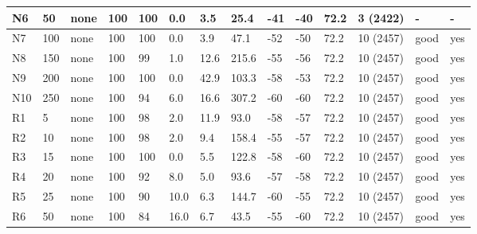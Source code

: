 \begin{center}
\begin{longtable}{|l|l|l|l|l|l|l|l|l|l|l|l|l|l|}
\hline
N6 & 50 & none & 100 & 100 & 0.0 & 3.5 & 25.4 & -41 & -40 & 72.2 & 3 (2422) & - & - \\
\hline
N7 & 100 & none & 100 & 100 & 0.0 & 3.9 & 47.1 & -52 & -50 & 72.2 & 10 (2457) & good & yes \\
\hline
N8 & 150 & none & 100 & 99 & 1.0 & 12.6 & 215.6 & -55 & -56 & 72.2 & 10 (2457) & good & yes \\
\hline
N9 & 200 & none & 100 & 100 & 0.0 & 42.9 & 103.3 & -58 & -53 & 72.2 & 10 (2457) & good & yes \\
\hline
N10 & 250 & none & 100 & 94 & 6.0 & 16.6 & 307.2 & -60 & -60 & 72.2 & 10 (2457) & good & yes \\
\hline
R1 & 5 & none & 100 & 98 & 2.0 & 11.9 & 93.0 & -58 & -57 & 72.2 & 10 (2457) & good & yes \\
\hline
R2 & 10 & none & 100 & 98 & 2.0 & 9.4 & 158.4 & -55 & -57 & 72.2 & 10 (2457) & good & yes \\
\hline
R3 & 15 & none & 100 & 100 & 0.0 & 5.5 & 122.8 & -58 & -60 & 72.2 & 10 (2457) & good & yes \\
\hline
R4 & 20 & none & 100 & 92 & 8.0 & 5.0 & 93.6 & -57 & -58 & 72.2 & 10 (2457) & good & yes \\
\hline
R5 & 25 & none & 100 & 90 & 10.0 & 6.3 & 144.7 & -60 & -55 & 72.2 & 10 (2457) & good & yes \\
\hline
R6 & 50 & none & 100 & 84 & 16.0 & 6.7 & 43.5 & -55 & -60 & 72.2 & 10 (2457) & good & yes \\
\hline
\end{longtable}
\end{center}

